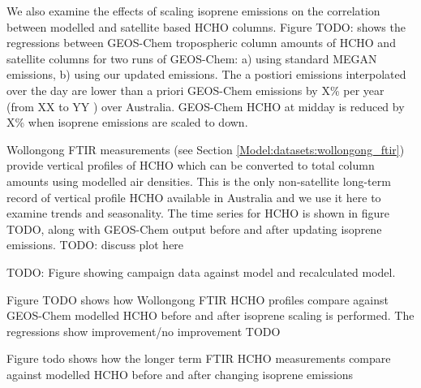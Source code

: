       
    
      We also examine the effects of scaling isoprene emissions on the correlation between modelled and satellite based HCHO columns.
      Figure TODO: shows the regressions between GEOS-Chem tropospheric column amounts of HCHO and satellite columns for two runs of GEOS-Chem: a) using standard MEGAN emissions, b) using our updated emissions.
      The a postiori emissions interpolated over the day are lower than a priori GEOS-Chem emissions by X\% per year (from XX to YY \tgpyr) over Australia.
      GEOS-Chem HCHO at midday is reduced by X\% when isoprene emissions are scaled to down.
      
      Wollongong FTIR measurements (see Section \ref{Model:datasets:wollongong_ftir}) provide vertical profiles of HCHO which can be converted to total column amounts using modelled air densities.
      This is the only non-satellite long-term record of vertical profile HCHO available in Australia and we use it here to examine trends and seasonality.
      The time series for HCHO is shown in figure TODO, along with GEOS-Chem output before and after updating isoprene emissions.
      TODO: discuss plot here
      
      TODO: Figure showing campaign data against model and recalculated model.
      
      
      Figure TODO shows how Wollongong FTIR HCHO profiles compare against GEOS-Chem modelled HCHO before and after isoprene scaling is performed. 
      The regressions show improvement/no improvement TODO 
      
      Figure todo shows how the longer term FTIR HCHO measurements compare against modelled HCHO before and after changing isoprene emissions
  
